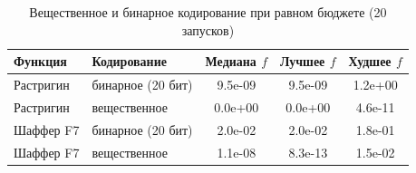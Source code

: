 \begin{table}[H]
\caption{Вещественное и бинарное кодирование при равном бюджете (20 запусков)}
\label{tab:realbin}
\centering
\small
\begin{tabular}{llccc}
\toprule
Функция & Кодирование & Медиана $f$ & Лучшее $f$ & Худшее $f$ \\
\midrule
Растригин & бинарное (20 бит) & 9.5e-09 & 9.5e-09 & 1.2e+00 \\
Растригин & вещественное & 0.0e+00 & 0.0e+00 & 4.6e-11 \\
Шаффер F7 & бинарное (20 бит) & 2.0e-02 & 2.0e-02 & 1.8e-01 \\
Шаффер F7 & вещественное & 1.1e-08 & 8.3e-13 & 1.5e-02 \\
\bottomrule
\end{tabular}
\end{table}
